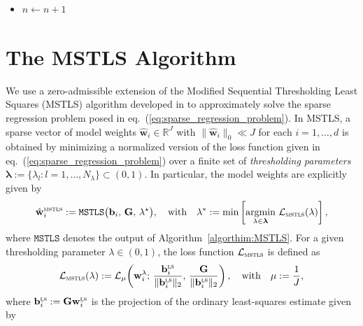 \documentclass[journal=gmj]{CUP-JNL-DTM}%
\DeclareMathOperator*{\argmin}{argmin}
\theoremstyle{definition}
\numberwithin{equation}{section}
\begin{document}
\begin{appendix}
{\begin{algorithm}
{\begin{enumerate}
\begin{itemize}
\begin{itemize}
                \item[$\circ$] $\mathbf{w}^{\lambda} \leftarrow \mathbf{w}_{n+1}$
            \end{itemize}

            \item $n \leftarrow n+1$
        \end{itemize}
    \end{enumerate}}
\end{algorithm}}

\vspace{-7mm}

\section{The MSTLS Algorithm}\label{appendixA:MSTLS}
We use a zero-admissible extension of the Modified Sequential Thresholding Least Squares (MSTLS) algorithm developed in \cite{Messenger.Bortz2021JournalofComputationalPhysics} to approximately solve the sparse regression problem posed in eq.~(\ref{eq:sparse_regression_problem}). {\color{black}In MSTLS, a sparse vector of model weights $\hat{\mathbf{w}}_i \in \mathbb{R}^J$ with $\|\hat{\mathbf{w}}_i\|_0 \ll J$ for each $i=1,\dots,d$ is obtained by minimizing a normalized version of the loss function given in eq.~(\ref{eq:sparse_regression_problem}) over a finite set of \textit{thresholding parameters} $\boldsymbol{\lambda} := \{\lambda_l : l = 1, \dots, N_{\lambda}\} \subset (0,1)$.} In particular, the model weights are explicitly given by \begin{align}\label{eq:wsindy_loss}
    \hat{\mathbf{w}}^{\textsc{mstls}}_i := \texttt{MSTLS}\big(\mathbf{b}_i, \, \mathbf{G}, \, \lambda^{\star}\big),
    \quad \text{with} \quad
    \lambda^* := \min \left[\argmin_{\lambda \in \boldsymbol{\lambda}} \, \mathcal{L}_{\textsc{mstls}}(\lambda) \right],
\end{align} where $\texttt{MSTLS}$ denotes the output of Algorithm~\ref{algorthim:MSTLS}. For a given thresholding parameter $\lambda \in (0,1)$, the loss function $\mathcal{L}_{\textsc{mstls}}$ is defined as \begin{align*}
    \mathcal{L}_{\textsc{mstls}}(\lambda) := \mathcal{L}_{\mu}\!\left(\mathbf{w}^{\lambda}_i; \, \frac{\mathbf{b}_{i}^{\textsc{ls}}}{\| \mathbf{b}_{i}^{\textsc{ls}} \|_2}, \, \frac{\mathbf{G}}{\| \mathbf{b}_{i}^{\textsc{ls}} \|_2}\right),
    \quad \text{with} \quad
    \mu := \frac{1}{J},
\end{align*} where $\mathbf{b}^{\textsc{ls}}_{i} := \mathbf{G}\mathbf{w}^{\textsc{ls}}_{i}$ is the projection of the ordinary least-squares estimate given by \begin{align*}

\end{align*}
\end{appendix}
\end{document}

